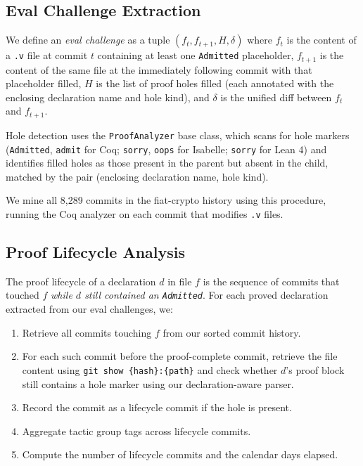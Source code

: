 \documentclass[11pt]{article}
\begin{document}
\subsection{Eval Challenge Extraction}

We define an \textit{eval challenge} as a tuple $(f_t, f_{t+1}, H, \delta)$ where $f_t$ is the content of a \texttt{.v} file at commit $t$ containing at least one \texttt{Admitted} placeholder, $f_{t+1}$ is the content of the same file at the immediately following commit with that placeholder filled, $H$ is the list of proof holes filled (each annotated with the enclosing declaration name and hole kind), and $\delta$ is the unified diff between $f_t$ and $f_{t+1}$.

Hole detection uses the \texttt{ProofAnalyzer} base class, which scans for hole markers (\texttt{Admitted}, \texttt{admit} for Coq; \texttt{sorry}, \texttt{oops} for Isabelle; \texttt{sorry} for Lean 4) and identifies filled holes as those present in the parent but absent in the child, matched by the pair (enclosing declaration name, hole kind).

We mine all 8,289 commits in the fiat-crypto history using this procedure, running the Coq analyzer on each commit that modifies \texttt{.v} files.

\subsection{Proof Lifecycle Analysis}

The proof lifecycle of a declaration $d$ in file $f$ is the sequence of commits that touched $f$ \textit{while $d$ still contained an \texttt{Admitted}}. For each proved declaration extracted from our eval challenges, we:

\begin{enumerate}
  \item Retrieve all commits touching $f$ from our sorted commit history.
  \item For each such commit before the proof-complete commit, retrieve the file content using \texttt{git show \{hash\}:\{path\}} and check whether $d$'s proof block still contains a hole marker using our declaration-aware parser.
  \item Record the commit as a lifecycle commit if the hole is present.
  \item Aggregate tactic group tags across lifecycle commits.
  \item Compute the number of lifecycle commits and the calendar days elapsed.
\end{enumerate}
\end{document}
